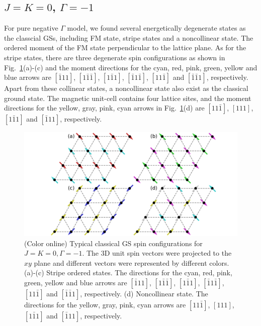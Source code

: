 \documentclass[aps,prb,reprint,amsfonts,amsmath,amssymb,showpacs,groupedaddress,superscriptaddress]{revtex4-1}
\begin{document}
\subsection{$J=K=0$, $\Gamma=-1$}

For pure negative $\Gamma$ model, we found several energetically degenerate states as the classcial GSs, including FM state, stripe states and a noncollinear state. The ordered moment of the FM state perpendicular to the lattice plane. As for the stripe states, there are three degenerate spin configurations as shown in Fig.~\ref{fig:GSForNegativeGamma}(a)-(c) and the moment directions for the cyan, red, pink, green, yellow and blue arrows are $[\bar{1}11]$, $[1\bar{1}\bar{1}]$, $[1\bar{1}1]$, $[\bar{1}1\bar{1}]$, $[11\bar{1}]$ and $[\bar{1}\bar{1}1]$, respectively. Apart from these collinear states, a noncollinear state also exist as the classical ground state. The magnetic unit-cell contains four lattice sites, and the moment directions for the yellow, gray, pink, cyan arrows in Fig.~\ref{fig:GSForNegativeGamma}(d) are $[11\bar{1}]$, $[111]$, $[1\bar{1}1]$ and $[\bar{1}11]$, respectively.
\begin{figure}
    \includegraphics[width=\columnwidth]{fig/SpinConfigForNegativeGamma.pdf}
    \caption{\label{fig:GSForNegativeGamma}(Color online) Typical classical GS spin configurations for $J=K=0, \Gamma=-1$. The 3D unit spin vectors were projected to the $xy$ plane and different vectors were represented by different colors. (a)-(c) Stripe ordered states. The directions for the cyan, red, pink, green, yellow and blue arrows are $[\bar{1}11]$, $[1\bar{1}\bar{1}]$, $[1\bar{1}1]$, $[\bar{1}1\bar{1}]$, $[11\bar{1}]$ and $[\bar{1}\bar{1}1]$, respectively. (d) Noncollinear state. The directions for the yellow, gray, pink, cyan arrows are $[11\bar{1}]$, $[111]$, $[1\bar{1}1]$ and $[\bar{1}11]$, respectively.}
\end{figure}
\end{document}

